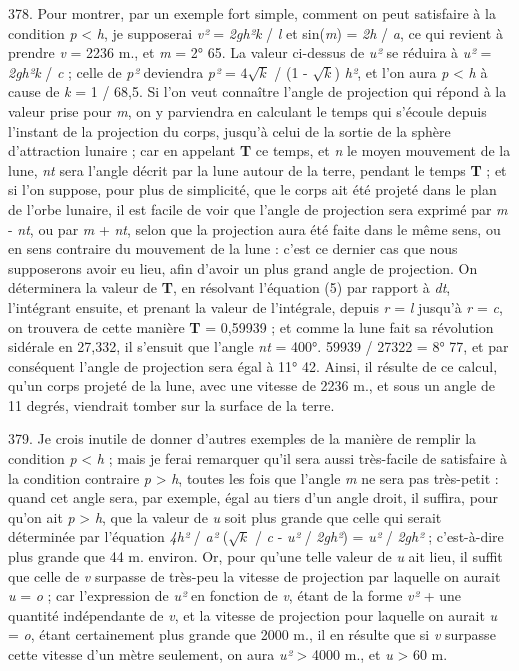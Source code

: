 \documentclass[a4paper, 11pt, oneside, polutonikogreek, french]{article}
\begin{document}
378. Pour montrer, par un exemple fort simple, comment on peut satisfaire à la condition \emph{p} < \emph{h}, je supposerai \emph{v²} = \emph{2gh²k} / \emph{l} et sin(\emph{m}) = \emph{2h} / \emph{a}, ce qui revient à prendre \emph{v} = 2236 m., et \emph{m} = 2° 65. La valeur ci-dessus de \emph{u²} se réduira à \emph{u²} = \emph{2gh²k} / \emph{c} ; celle de \emph{p²} deviendra \emph{p²} = $4\sqrt{k}$ / (1 - $\sqrt{k}$) \emph{h²}, et l'on aura \emph{p} < \emph{h} à cause de \emph{k} = 1 / 68,5. Si l'on veut connaître l'angle de projection qui répond à la valeur prise pour \emph{m}, on y parviendra en calculant le temps qui s'écoule depuis l'instant de la projection du corps, jusqu'à celui de la sortie de la sphère d'attraction lunaire ; car en appelant \textbf{T} ce temps, et \emph{n} le moyen mouvement de la lune, \emph{nt} sera l'angle décrit par la lune autour de la terre, pendant le temps \textbf{T} ; et si l'on suppose, pour plus de simplicité, que le corps ait été projeté dans le plan de l'orbe lunaire, il est facile de voir que l'angle de projection sera exprimé par \emph{m} - \emph{nt}, ou par \emph{m} + \emph{nt}, selon que la projection aura été faite dans le même sens, ou en sens contraire du mouvement de la lune : c'est ce dernier cas que nous supposerons avoir eu lieu, afin d'avoir un plus grand angle de projection. On déterminera la valeur de \textbf{T}, en résolvant l'équation (5) par rapport à \emph{dt}, l'intégrant ensuite, et prenant la valeur de l'intégrale, depuis \emph{r} = \emph{l} jusqu'à \emph{r} = \emph{c}, on trouvera de cette manière \textbf{T} = 0,59939 ; et comme la lune fait sa révolution sidérale en 27,332, il s'ensuit que l'angle \emph{nt} = 400°. 59939 / 27322 = 8° 77, et par conséquent l'angle de projection sera égal à 11° 42. Ainsi, il résulte de ce calcul, qu'un corps projeté de la lune, avec une vitesse de 2236 m., et sous un angle de 11 degrés, viendrait tomber sur la surface de la terre.

379. Je crois inutile de donner d'autres exemples de la manière de remplir la condition \emph{p} < \emph{h} ; mais je ferai remarquer qu'il sera aussi très-facile de satisfaire à la condition contraire \emph{p} > \emph{h}, toutes les fois que l'angle \emph{m} ne sera pas très-petit : quand cet angle sera, par exemple, égal au tiers d'un angle droit, il suffira, pour qu'on ait \emph{p} > \emph{h}, que la valeur de \emph{u} soit plus grande que celle qui serait déterminée par l'équation \emph{4h²} / \emph{a²} ($\sqrt{k}$ / \emph{c} - \emph{u²} / \emph{2gh²}) = \emph{u²} / \emph{2gh²} ; c'est-à-dire plus grande que 44 m. environ. Or, pour qu'une telle valeur de \emph{u} ait lieu, il suffit que celle de \emph{v} surpasse de très-peu la vitesse de projection par laquelle on aurait \emph{u} = \emph{o} ; car l'expression de \emph{u²} en fonction de \emph{v}, étant de la forme \emph{v²} + une quantité indépendante de \emph{v}, et la vitesse de projection pour laquelle on aurait \emph{u} = \emph{o}, étant certainement plus grande que 2000 m., il en résulte que si \emph{v} surpasse cette vitesse d'un mètre seulement, on aura \emph{u²} > 4000 m., et \emph{u} > 60 m.
\end{document}

